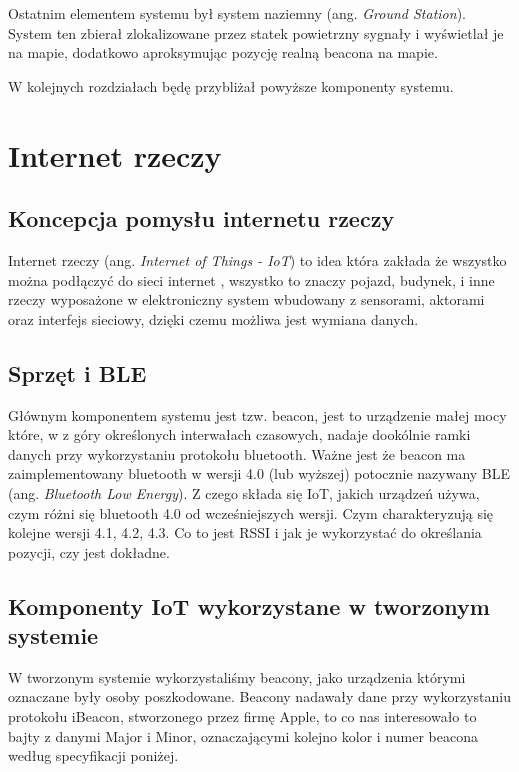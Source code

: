 Ostatnim elementem systemu był system naziemny (ang. \textit{Ground Station}). System ten zbierał zlokalizowane przez statek powietrzny sygnały i wyświetlał je na mapie, dodatkowo aproksymując pozycję realną beacona na mapie.

W kolejnych rozdziałach będę przybliżał powyższe komponenty systemu.

\section{Internet rzeczy}
\subsection{Koncepcja pomysłu internetu rzeczy}
Internet rzeczy (ang. \textit{Internet of Things - IoT}) to idea która zakłada że wszystko można podłączyć do sieci internet \cite{iot}, wszystko to znaczy pojazd, budynek, i inne rzeczy wyposażone w elektroniczny system wbudowany z sensorami, aktorami oraz interfejs sieciowy, dzięki czemu możliwa jest wymiana danych. 


\subsection{Sprzęt i BLE}
Głównym komponentem systemu jest tzw. beacon, jest to urządzenie małej mocy które, w z góry określonych interwałach czasowych, nadaje dookólnie ramki danych przy wykorzystaniu protokołu bluetooth. Ważne jest że beacon ma zaimplementowany bluetooth w wersji 4.0 (lub wyższej) potocznie nazywany BLE (ang. \textit{Bluetooth Low Energy}).
Z czego składa się IoT, jakich urządzeń używa, czym różni się bluetooth 4.0 od wcześniejszych wersji. Czym charakteryzują się kolejne wersji 4.1, 4.2, 4.3. Co to jest RSSI i jak je wykorzystać do określania pozycji, czy jest dokładne.
\subsection{Komponenty IoT wykorzystane w tworzonym systemie}
W tworzonym systemie wykorzystaliśmy beacony, jako urządzenia którymi oznaczane były osoby poszkodowane. Beacony nadawały dane przy wykorzystaniu protokołu iBeacon\cite{ibeacon}, stworzonego przez firmę Apple, to co nas interesowało to bajty z danymi Major i Minor, oznaczającymi kolejno kolor i numer beacona według specyfikacji poniżej.

